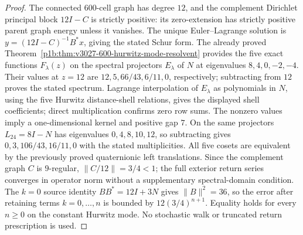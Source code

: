 \documentclass[11pt]{article}
\begin{document}
\begin{proof}
The connected $600$-cell graph has degree $12$, and the complement Dirichlet
principal block $12I-C$ is strictly positive: its zero-extension has
strictly positive parent graph energy unless it vanishes.  The unique
Euler--Lagrange solution is $y=(12I-C)^{-1}B^*x$, giving the stated Schur
form.  The already proved
Theorem~\ref{p1b:thm:v3027-600-hurwitz-mode-resolvent} provides the five
exact functions $F_\lambda(z)$ on the spectral projectors $E_\lambda$
of $N$ at eigenvalues $8,4,0,-2,-4$.  Their values at $z=12$ are
$12,5,66/43,6/11,0$, respectively; subtracting from $12$ proves the
stated spectrum.  Lagrange interpolation of $E_\lambda$ as polynomials
in $N$, using the five Hurwitz distance-shell relations, gives the displayed
shell coefficients; direct multiplication confirms zero row sums.
The nonzero values imply a one-dimensional kernel and positive gap $7$.
On the same projectors $L_{24}=8I-N$ has eigenvalues $0,4,8,10,12$,
so subtracting gives $0,3,106/43,16/11,0$ with the stated multiplicities.
All five cosets are equivalent by the previously proved quaternionic
left translations. Since the complement graph $C$ is $9$-regular,
$\|C/12\|=3/4<1$; the full exterior return series converges in
operator norm without a supplementary spectral-domain condition. The
$k=0$ source identity $BB^*=12I+3N$ gives $\|B\|^2=36$, so the
error after retaining terms $k=0,\ldots,n$ is bounded by
$12(3/4)^{n+1}$. Equality holds for every $n\ge0$ on the constant
Hurwitz mode.  No stochastic walk or truncated return prescription
is used.
\end{proof}
\end{document}
